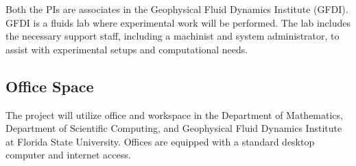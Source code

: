 \documentclass[11pt]{article}
\begin{document}
Both the PIs are associates in the Geophysical Fluid Dynamics Institute
(GFDI). GFDI is a fluids lab where experimental work will be performed.
The lab includes the necessary support staff, including a machinist and
system administrator, to assist with experimental setups and
computational needs.

\subsection*{Office Space}
The project will utilize office and workspace in the Department of
Mathematics, Department of Scientific Computing, and Geophysical Fluid
Dynamics Institute at Florida State University. Offices are equipped
with a standard desktop computer and internet access.
\end{document}
